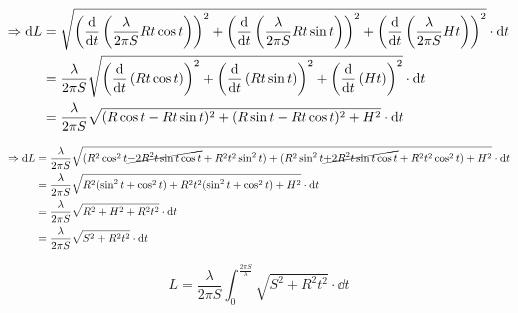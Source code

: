 \begin{align*}
    \Rightarrow \dd{L} & = \sqrt{\left(\dv{t}\left(\frac{\lambda}{2\pi S}Rt\cos{t}\right)\right)^2+\left(\dv{t}\left(\frac{\lambda}{2\pi S}Rt\sin{t}\right)\right)^2+\left(\dv{t}\left(\frac{\lambda}{2\pi S}Ht\right)\right)^2} \cdot \dd{t} \\
                       & = \frac{\lambda}{2\pi S}\sqrt{\left(\dv{t}\left(Rt\cos{t}\right)\right)^2+\left(\dv{t}\left(Rt\sin{t}\right)\right)^2+\left(\dv{t}\left(Ht\right)\right)^2} \cdot \dd{t}                                             \\
                       & = \frac{\lambda}{2\pi S}\sqrt{(R\cos{t}-Rt\sin{t})^2+(R\sin{t}-Rt\cos{t})^2+H^2} \cdot \dd{t}
\end{align*}
\begin{small}
    \begin{align}
        \Rightarrow \dd{L} & = \frac{\lambda}{2\pi S}\sqrt{(R^2\cos^2{t}\cancel{-2R^2t\sin{t}\cos{t}}+R^2t^2\sin^2{t})+(R^2\sin^2{t}\cancel{+2R^2t\sin{t}\cos{t}}+R^2t^2\cos^2{t})+H^2} \cdot \dd{t} \notag \\
                           & = \frac{\lambda}{2\pi S}\sqrt{R^2(\sin^2{t} + \cos^2{t})+ R^2t^2(\sin^2{t}+\cos^2{t})+H^2} \cdot \dd{t} \notag                                                                 \\
                           & = \frac{\lambda}{2\pi S}\sqrt{R^2 +H^2 + R^2t^2} \cdot \dd{t} \notag                                                                                                           \\
                           & = \frac{\lambda}{2\pi S}\sqrt{S^2 + R^2t^2} \cdot \dd{t}
    \end{align}
\end{small}
\begin{equation}
    L = \frac{\lambda}{2\pi S}\int_0^\frac{2\pi S}{\lambda} \sqrt{S^2 + R^2t^2} \cdot \dd{t} \label{eq:integral}
\end{equation}
